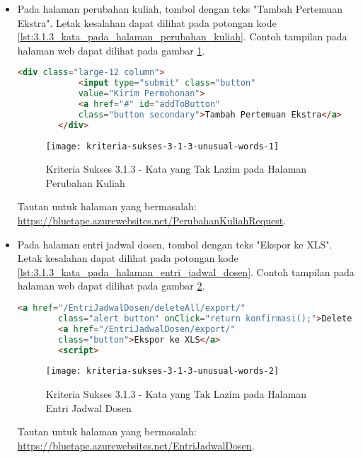 \begin{itemize}
    \item Pada halaman perubahan kuliah, tombol dengan teks "Tambah Pertemuan Ekstra". Letak kesalahan dapat dilihat pada potongan kode \ref{lst:3.1.3_kata_pada_halaman_perubahan_kuliah}. Contoh tampilan pada halaman web dapat dilihat pada gambar \ref{fig:3.1.3_unusual_words_1}.
    \begin{lstlisting}[frame=single, label={lst:3.1.3_kata_pada_halaman_perubahan_kuliah}, language=HTML, caption=Kriteria Sukses 3.1.3 - Kata yang Tak Lazim pada Halaman Perubahan Kuliah]
        <div class="large-12 column">
            <input type="submit" class="button" 
            value="Kirim Permohonan">
            <a href="#" id="addToButton" 
            class="button secondary">Tambah Pertemuan Ekstra</a>
        </div>
    \end{lstlisting}
    
    \begin{figure}[H]
        \centering  
        \texttt{[image: kriteria-sukses-3-1-3-unusual-words-1]}  
        \caption[Kriteria Sukses 3.1.3 - Kata yang Tak Lazim pada Halaman Perubahan Kuliah]{Kriteria Sukses 3.1.3 - Kata yang Tak Lazim pada Halaman Perubahan Kuliah}
        \label{fig:3.1.3_unusual_words_1}  
    \end{figure}
    Tautan untuk halaman yang bermasalah: \url{https://bluetape.azurewebsites.net/PerubahanKuliahRequest}.

    \item Pada halaman entri jadwal dosen, tombol dengan teks "Ekspor ke XLS". Letak kesalahan dapat dilihat pada potongan kode \ref{lst:3.1.3_kata_pada_halaman_entri_jadwal_dosen}. Contoh tampilan pada halaman web dapat dilihat pada gambar \ref{fig:3.1.3_unusual_words_2}.
    \begin{lstlisting}[frame=single, label={lst:3.1.3_kata_pada_halaman_entri_jadwal_dosen}, language=HTML, caption=Kriteria Sukses 3.1.3 - Kata yang Tak Lazim pada Halaman Entri Jadwal Dosen]
        <a href="/EntriJadwalDosen/deleteAll/export/"
        class="alert button" onClick="return konfirmasi();">Delete All</a>
        <a href="/EntriJadwalDosen/export/" 
        class="button">Ekspor ke XLS</a>
        <script>
    \end{lstlisting}
    
    \begin{figure}[H]
        \centering  
        \texttt{[image: kriteria-sukses-3-1-3-unusual-words-2]}  
        \caption[Kriteria Sukses 3.1.3 - Kata yang Tak Lazim pada Halaman Entri Jadwal Dosen]{Kriteria Sukses 3.1.3 - Kata yang Tak Lazim pada Halaman Entri Jadwal Dosen}
        \label{fig:3.1.3_unusual_words_2}  
    \end{figure}
    Tautan untuk halaman yang bermasalah: \url{https://bluetape.azurewebsites.net/EntriJadwalDosen}.


\end{itemize}
